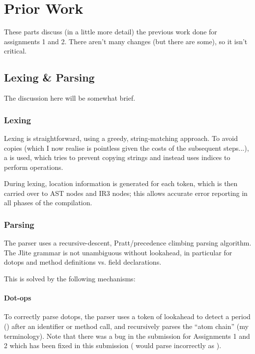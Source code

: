 \documentclass[12pt]{article}
\begin{document}
\pagebreak
\section{Prior Work}

These parts discuss (in a little more detail) the previous work done for assignments 1 and 2. There aren't many changes (but there
are some), so it isn't critical.


\subsection{Lexing \& Parsing}

The discussion here will be somewhat brief.

\subsubsection{Lexing}

Lexing is straightforward, using a greedy, string-matching approach. To avoid copies (which I now realise
is pointless given the costs of the subsequent steps...), a  is used, which tries to prevent
copying strings and instead uses indices to perform operations.

During lexing, location information is generated for each token, which is then carried over to AST nodes and IR3 nodes;
this allows accurate error reporting in all phases of the compilation.



\subsubsection{Parsing}

The parser uses a recursive-descent, Pratt/precedence climbing parsing algorithm. The Jlite grammar is not unambiguous
without lookahead, in particular for dotops and method definitions vs. field declarations.

This is solved by the following mechanisms:

\paragraph{Dot-ops}

To correctly parse dotops, the parser uses a token of lookahead to detect a period () after an identifier
or method call, and recursively parses the \enquote{atom chain} (my terminology). Note that there was a bug in
the submission for Assignments 1 and 2 which has been fixed in this submission ( would parse
incorrectly as ).
\end{document}
